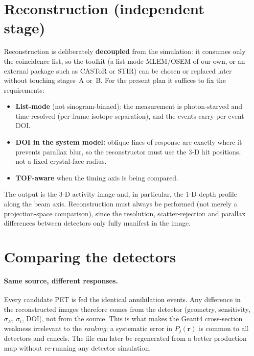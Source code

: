 \documentclass[11pt]{article}
\begin{document}
\section{Reconstruction (independent stage)}
\label{sec:recon}

Reconstruction is deliberately \textbf{decoupled} from the simulation: it consumes
only the coincidence list, so the toolkit (a list-mode MLEM/OSEM of our own, or an
external package such as CASToR or STIR) can be chosen or replaced later without
touching stages~A or~B. For the present plan it suffices to fix the requirements:
\begin{itemize}[nosep]
\item \textbf{List-mode} (not sinogram-binned): the measurement is photon-starved
and time-resolved (per-frame isotope separation), and the events carry per-event
DOI.
\item \textbf{DOI in the system model:} oblique lines of response are exactly where
it prevents parallax blur, so the reconstructor must use the 3-D hit positions, not
a fixed crystal-face radius.
\item \textbf{TOF-aware} when the timing axis is being compared.
\end{itemize}
The output is the 3-D activity image and, in particular, the 1-D depth profile
along the beam axis. Reconstruction must always be performed (not merely a
projection-space comparison), since the resolution, scatter-rejection and parallax
differences between detectors only fully manifest in the image.

\section{Comparing the detectors}
\label{sec:compare}

\paragraph{Same source, different responses.}
Every candidate PET is fed the identical annihilation events. Any difference in
the reconstructed images therefore comes from the detector (geometry, sensitivity,
$\sigma_E$, $\sigma_t$, DOI), not from the source. This is what makes the Geant4
cross-section weakness irrelevant to the \emph{ranking}: a systematic error in
$P_j(\mathbf{r})$ is common to all detectors and cancels. The file can later be
regenerated from a better production map without re-running any detector
simulation.
\end{document}
